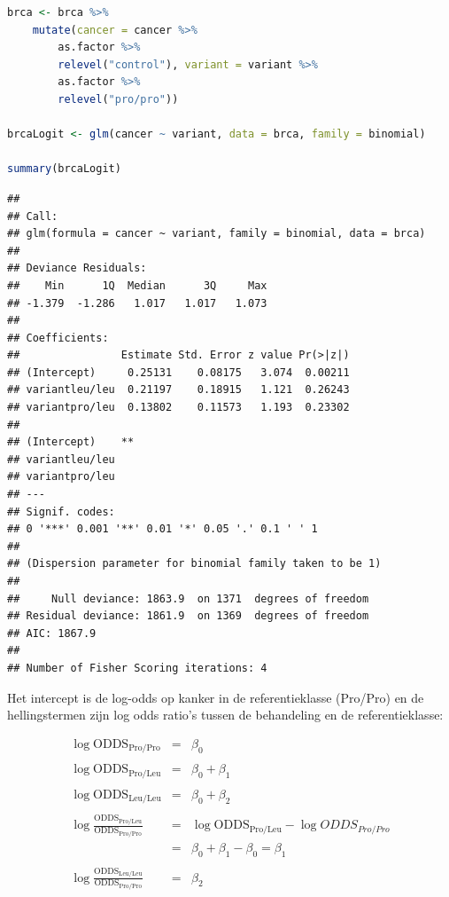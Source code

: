 \documentclass[
  12pt,dutch,coursenotes]{book}
\begin{document}
\begin{lstlisting}[language=R]
brca <- brca %>%
    mutate(cancer = cancer %>%
        as.factor %>%
        relevel("control"), variant = variant %>%
        as.factor %>%
        relevel("pro/pro"))

brcaLogit <- glm(cancer ~ variant, data = brca, family = binomial)

summary(brcaLogit)
\end{lstlisting}

\begin{lstlisting}
## 
## Call:
## glm(formula = cancer ~ variant, family = binomial, data = brca)
## 
## Deviance Residuals: 
##    Min      1Q  Median      3Q     Max  
## -1.379  -1.286   1.017   1.017   1.073  
## 
## Coefficients:
##                Estimate Std. Error z value Pr(>|z|)
## (Intercept)     0.25131    0.08175   3.074  0.00211
## variantleu/leu  0.21197    0.18915   1.121  0.26243
## variantpro/leu  0.13802    0.11573   1.193  0.23302
##                  
## (Intercept)    **
## variantleu/leu   
## variantpro/leu   
## ---
## Signif. codes:  
## 0 '***' 0.001 '**' 0.01 '*' 0.05 '.' 0.1 ' ' 1
## 
## (Dispersion parameter for binomial family taken to be 1)
## 
##     Null deviance: 1863.9  on 1371  degrees of freedom
## Residual deviance: 1861.9  on 1369  degrees of freedom
## AIC: 1867.9
## 
## Number of Fisher Scoring iterations: 4
\end{lstlisting}

Het intercept is de log-odds op kanker in de referentieklasse (Pro/Pro) en de hellingstermen zijn log odds ratio's tussen de behandeling en de referentieklasse:

\begin{eqnarray*}
\log \text{ODDS}_\text{Pro/Pro}&=&\beta_0\\\\
\log \text{ODDS}_\text{Pro/Leu}&=&\beta_0+\beta_1\\\\
\log \text{ODDS}_\text{Leu/Leu}&=&\beta_0+\beta_2\\\\
\log  \frac{\text{ODDS}_\text{Pro/Leu}}{\text{ODDS}_\text{Pro/Pro}}&=&\log \text{ODDS}_\text{Pro/Leu}-\log ODDS_{Pro/Pro}\\
&=&\beta_0+\beta_1-\beta_0=\beta_1\\\\
\log  \frac{\text{ODDS}_\text{Leu/Leu}}{\text{ODDS}_\text{Pro/Pro}}&=&\beta_2
\end{eqnarray*}
\end{document}
